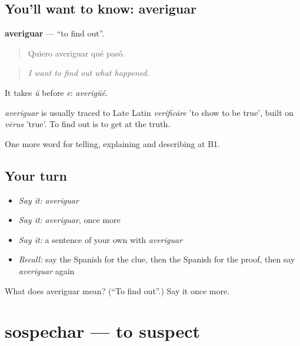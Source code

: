 \subsection*{You'll want to know: averiguar}
\textbf{averiguar} — \textquotedblleft{}to find out\textquotedblright{}.

\begin{quote}
Quiero averiguar qué pasó.
\end{quote}

\begin{quote}
\emph{I want to find out what happened.}
\end{quote}

It takes \emph{ü} before \emph{e}: \emph{averigüé}.

\begin{cousinweb}
\emph{averiguar} is usually traced to Late Latin \emph{verificāre} 'to show to be true', built on \emph{vērus} 'true'. To find out is to get at the truth.
\end{cousinweb}

\begin{grammarlens}[title={What you've built}]
One more word for telling, explaining and describing at B1.
\end{grammarlens}

\subsection*{Your turn}
\begin{itemize}
\raggedright
  \item \emph{Say it:} \emph{averiguar}
  \item \emph{Say it:} \emph{averiguar}, once more
  \item \emph{Say it:} a sentence of your own with \emph{averiguar}
  \item \emph{Recall:} say the Spanish for the clue, then the Spanish for the proof, then say \emph{averiguar} again
\end{itemize}

\begin{tcolorbox}[breakable,colback=teal!4,colframe=teal!35!black,title={Before you move on}]
What does averiguar mean? (\textquotedblleft{}To find out\textquotedblright{}.) Say it once more.
\end{tcolorbox}
\section[sospechar]{sospechar — to suspect}


